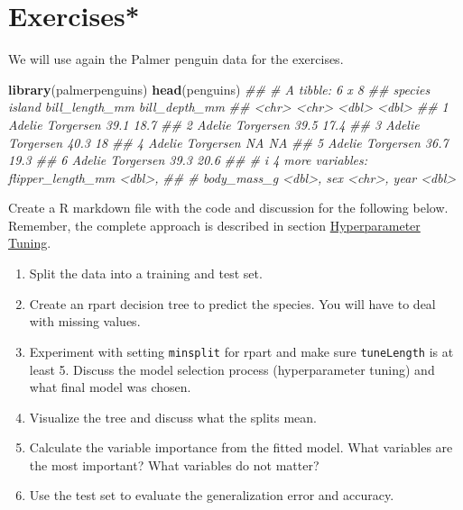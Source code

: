 \documentclass[
  notitlepage]{book}
\newenvironment{Shaded}{\begin{snugshade}}{\end{snugshade}}
\newcommand{\CommentTok}[1]{\textcolor[rgb]{0.56,0.35,0.01}{\textit{#1}}}
\newcommand{\KeywordTok}[1]{\textcolor[rgb]{0.13,0.29,0.53}{\textbf{#1}}}
\newcommand{\NormalTok}[1]{#1}
\providecommand{\tightlist}{%
  \setlength{\itemsep}{0pt}\setlength{\parskip}{0pt}}
\begin{document}
\hypertarget{exercises-1}{%
\section{Exercises*}\label{exercises-1}}

We will use again the Palmer penguin data for the exercises.

\begin{Shaded}
\begin{Highlighting}[]
\KeywordTok{library}\NormalTok{(palmerpenguins)}
\KeywordTok{head}\NormalTok{(penguins)}
\CommentTok{\#\# \# A tibble: 6 x 8}
\CommentTok{\#\#   species island    bill\_length\_mm bill\_depth\_mm}
\CommentTok{\#\#   \textless{}chr\textgreater{}   \textless{}chr\textgreater{}              \textless{}dbl\textgreater{}         \textless{}dbl\textgreater{}}
\CommentTok{\#\# 1 Adelie  Torgersen           39.1          18.7}
\CommentTok{\#\# 2 Adelie  Torgersen           39.5          17.4}
\CommentTok{\#\# 3 Adelie  Torgersen           40.3          18  }
\CommentTok{\#\# 4 Adelie  Torgersen           NA            NA  }
\CommentTok{\#\# 5 Adelie  Torgersen           36.7          19.3}
\CommentTok{\#\# 6 Adelie  Torgersen           39.3          20.6}
\CommentTok{\#\# \# i 4 more variables: flipper\_length\_mm \textless{}dbl\textgreater{},}
\CommentTok{\#\# \#   body\_mass\_g \textless{}dbl\textgreater{}, sex \textless{}chr\textgreater{}, year \textless{}dbl\textgreater{}}
\end{Highlighting}
\end{Shaded}

Create a R markdown file with the code and discussion for the following below.
Remember, the complete approach is described in section \protect\hyperlink{hyperparameter-tuning}{Hyperparameter Tuning}.

\begin{enumerate}
\def\labelenumi{\arabic{enumi}.}
\tightlist
\item
  Split the data into a training and test set.
\item
  Create an rpart decision tree to predict the species. You will have to deal with
  missing values.
\item
  Experiment with setting \texttt{minsplit} for rpart and make sure \texttt{tuneLength} is
  at least 5.
  Discuss the model selection process (hyperparameter tuning) and what final
  model was chosen.
\item
  Visualize the tree and discuss what the splits mean.
\item
  Calculate the variable importance from the fitted model. What variables are
  the most important? What variables do not matter?
\item
  Use the test set to evaluate the generalization error and accuracy.
\end{enumerate}
\end{document}
